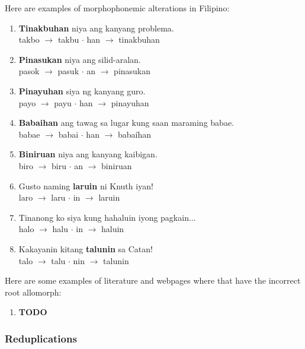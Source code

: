 \begin{example}
      Here are examples of morphophonemic alterations in Filipino:
\end{example}
\begin{enumerate}
      \item \textbf{Tinakbuhan} niya ang kanyang problema. \\
            takbo \(\rightarrow\) takbu \(\cdot\) han \(\rightarrow\) tinakbuhan
      \item \textbf{Pinasukan} niya ang silid-aralan. \\
            pasok \(\rightarrow\) pasuk \(\cdot\) an \(\rightarrow\) pinasukan
      \item \textbf{Pinayuhan} siya ng kanyang guro. \\
            payo \(\rightarrow\) payu \(\cdot\) han \(\rightarrow\) pinayuhan
      \item \textbf{Babaihan} ang tawag sa lugar kung saan maraming babae. \\
            babae \(\rightarrow\) babai \(\cdot\) han \(\rightarrow\) babaíhan
      \item \textbf{Biniruan} niya ang kanyang kaibigan. \\
            biro \(\rightarrow\) biru \(\cdot\) an \(\rightarrow\) biniruan
      \item Gusto naming \textbf{laruin} ni Knuth iyan! \\
            laro  \(\rightarrow\) laru \(\cdot\) in \(\rightarrow\) laruin
      \item Tinanong ko siya kung hahaluin iyong pagkain... \\
            halo  \(\rightarrow\) halu \(\cdot\) in \(\rightarrow\) haluin
      \item Kakayanin kitang \textbf{talunin} sa Catan! \\
            talo  \(\rightarrow\) talu \(\cdot\) nin  \(\rightarrow\) talunin
\end{enumerate}


\begin{example}
      Here are some examples of literature and webpages where that have the incorrect
      root allomorph:
\end{example}
\begin{enumerate}
      \item \textbf{TODO}
\end{enumerate}

\subsubsection{Reduplications}

